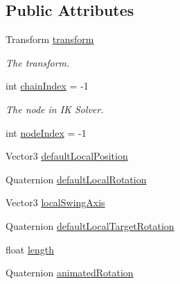 \subsection*{Public Attributes}
\begin{DoxyCompactItemize}
\item 
Transform \mbox{\hyperlink{class_root_motion_1_1_final_i_k_1_1_i_k_mapping_1_1_bone_map_a6e6e445ada57edda918a157d6c5b3f4f}{transform}}
\begin{DoxyCompactList}\small\item\em The transform. \end{DoxyCompactList}\item 
int \mbox{\hyperlink{class_root_motion_1_1_final_i_k_1_1_i_k_mapping_1_1_bone_map_a094c9783210e16d1a8b6030ed257a322}{chain\+Index}} = -\/1
\begin{DoxyCompactList}\small\item\em The node in IK Solver. \end{DoxyCompactList}\item 
int \mbox{\hyperlink{class_root_motion_1_1_final_i_k_1_1_i_k_mapping_1_1_bone_map_a9f1b9592d3392a99018fa603dc8263c6}{node\+Index}} = -\/1
\item 
Vector3 \mbox{\hyperlink{class_root_motion_1_1_final_i_k_1_1_i_k_mapping_1_1_bone_map_af705a4535aabf7a2a17190e817784cb4}{default\+Local\+Position}}
\item 
Quaternion \mbox{\hyperlink{class_root_motion_1_1_final_i_k_1_1_i_k_mapping_1_1_bone_map_ae4eb82a2ec679c766d725ab3a6083341}{default\+Local\+Rotation}}
\item 
Vector3 \mbox{\hyperlink{class_root_motion_1_1_final_i_k_1_1_i_k_mapping_1_1_bone_map_a35aab44797f0482fda7b8ae6ad06d380}{local\+Swing\+Axis}}
\item 
Quaternion \mbox{\hyperlink{class_root_motion_1_1_final_i_k_1_1_i_k_mapping_1_1_bone_map_a8c44fff3b70883ef19ad8f5d963c25ce}{default\+Local\+Target\+Rotation}}
\item 
float \mbox{\hyperlink{class_root_motion_1_1_final_i_k_1_1_i_k_mapping_1_1_bone_map_ae986959fccf475540bde1c8d64c41c09}{length}}
\item 
Quaternion \mbox{\hyperlink{class_root_motion_1_1_final_i_k_1_1_i_k_mapping_1_1_bone_map_a8c44b5258a036fdfbb73409ec5d9145d}{animated\+Rotation}}
\end{DoxyCompactItemize}
